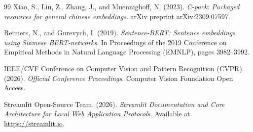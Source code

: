 \documentclass[12pt,a4paper]{article}
\begin{document}
\newpage
\begin{thebibliography}{99}
Xiao, S., Liu, Z., Zhang, J., and Muennighoff, N. (2023). 
\textit{C-pack: Packaged resources for general chinese embeddings}. 
arXiv preprint arXiv:2309.07597.

Reimers, N., and Gurevych, I. (2019). 
\textit{Sentence-BERT: Sentence embeddings using Siamese BERT-networks}. 
In Proceedings of the 2019 Conference on Empirical Methods in Natural Language Processing (EMNLP), pages 3982--3992.

IEEE/CVF Conference on Computer Vision and Pattern Recognition (CVPR). (2026). 
\textit{Official Conference Proceedings}. 
Computer Vision Foundation Open Access.

Streamlit Open-Source Team. (2026). 
\textit{Streamlit Documentation and Core Architecture for Local Web Application Protocols}. 
Available at \url{https://streamlit.io}.

\end{thebibliography}
\end{document}
